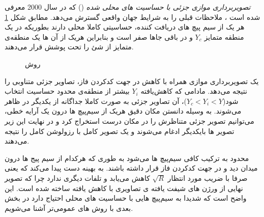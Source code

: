 \textit{تصویربرداری موازی جزئی با حساسیت های محلی شده}
()
که در سال 2000 معرفی شده است
\cite{PILS-Griswold2000}
، ملاحظات قبلی را به شرایط جهان واقعی گسترش می‌دهد.
مطابق شکل \ref{fig:pils-rec-image}
هر یک از سیم پیچ های دریافت کننده، حساسیتی کاملا محلی دارند بطوریکه در یک منطقه متمایز $Y_c$ و در باقی جاها صفر است و بنابراین هریک از آن ها یک منطقه‌ی متمایز از  شئ را تحت پوشش قرار می‌دهند.




\begin{figure}[t!]
	\centering
	\removevspace[1]
	\caption{روش }
	\label{fig:pils-rec-image}
\end{figure}

یک تصویربرداری موازی همراه با کاهش در جهت کدکردن فاز، تصاویر جزئی متناوبی را نتیجه می‌دهد. مادامی که  کاهش‌یافته $Y_i$ بیشتر از منطقه‌ی محدود حساسیت انتخاب شود($Y_c < Y_i < Y$)، آن تصاویر جزئی به صورت کاملا جداگانه از یکدیگر در  ظاهر می‌شوند.
به وسیله دانستن مکان دقیق هریک از سیم‌پیچ ها درون یک آرایه خطی، می‌توانیم تصویر جزئی متناظرش را در مکان درست استخراج کرد و در نهایت این زیر تصویر ها بایکدیگر ادغام می‌شوند و یک تصویر کامل با رزولوشن کامل را نتیجه می‌دهند.
\cite{SMASH-SENSE-PILS-GRAPPA--2004}


محدود به ترکیب کافی سیم‌پیچ ها می‌شود به طوری که هرکدام از سیم پیج ها درون میدان دید  و در جهت کدکردن فاز قرار داشته باشند.
به 
بهینه دست پیدا می‌کند که یعنی 
صرفا با ضریب مورد انتظار $\sqrt{R}$ کاهش می‌یابد و  تلفات دیگری ندارد چرا که تصویر نهایی از ورژن های شیفت یافته ی تصاویری با 
کاهش یافته ساخته شده است. این واضح است که 
شدیدا به سیم‌پیچ هایی با حساسیت های محلی احتیاج دارد در بخش بعدی با روش های عمومی‌تر آشنا می‌شویم.










